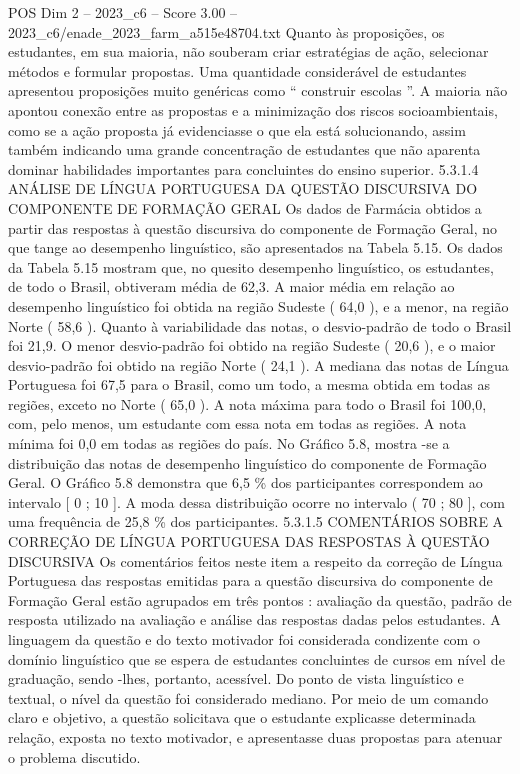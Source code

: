 \begin{textsample}{POS Dim 2 – 2023\_c6 – Score 3.00 – 2023\_c6/enade\_2023\_farm\_a515e48704.txt}
Quanto às proposições, os estudantes, em sua maioria, não souberam criar estratégias de ação, selecionar métodos e formular propostas.
Uma quantidade considerável de estudantes apresentou proposições muito genéricas como “ construir escolas ”.
A maioria não apontou conexão entre as propostas e a minimização dos riscos socioambientais, como se a ação proposta já evidenciasse o que ela está solucionando, assim também indicando uma grande concentração de estudantes que não aparenta dominar habilidades importantes para concluintes do ensino superior. 5.3.1.4 ANÁLISE DE LÍNGUA PORTUGUESA DA QUESTÃO DISCURSIVA DO COMPONENTE DE FORMAÇÃO GERAL Os dados de Farmácia obtidos a partir das respostas à questão discursiva do componente de Formação Geral, no que tange ao desempenho linguístico, são apresentados na Tabela 5.15.
Os dados da Tabela 5.15 mostram que, no quesito desempenho linguístico, os estudantes, de todo o Brasil, obtiveram média de 62,3.
A maior média em relação ao desempenho linguístico foi obtida na região Sudeste ( 64,0 ), e a menor, na região Norte ( 58,6 ).
Quanto à variabilidade das notas, o desvio-padrão de todo o Brasil foi 21,9.
O menor desvio-padrão foi obtido na região Sudeste ( 20,6 ), e o maior desvio-padrão foi obtido na região Norte ( 24,1 ).
A mediana das notas de Língua Portuguesa foi 67,5 para o Brasil, como um todo, a mesma obtida em todas as regiões, exceto no Norte ( 65,0 ).
A nota máxima para todo o Brasil foi 100,0, com, pelo menos, um estudante com essa nota em todas as regiões.
A nota mínima foi 0,0 em todas as regiões do país.
No Gráfico 5.8, mostra -se a distribuição das notas de desempenho linguístico do componente de Formação Geral.
O Gráfico 5.8 demonstra que 6,5 \% dos participantes correspondem ao intervalo [ 0 ; 10 ].
A moda dessa distribuição ocorre no intervalo ( 70 ; 80 ], com uma frequência de 25,8 \% dos participantes. 5.3.1.5 COMENTÁRIOS SOBRE A CORREÇÃO DE LÍNGUA PORTUGUESA DAS RESPOSTAS À QUESTÃO DISCURSIVA Os comentários feitos neste item a respeito da correção de Língua Portuguesa das respostas emitidas para a questão discursiva do componente de Formação Geral estão agrupados em três pontos : avaliação da questão, padrão de resposta utilizado na avaliação e análise das respostas dadas pelos estudantes.
A linguagem da questão e do texto motivador foi considerada condizente com o domínio linguístico que se espera de estudantes concluintes de cursos em nível de graduação, sendo -lhes, portanto, acessível.
Do ponto de vista linguístico e textual, o nível da questão foi considerado mediano.
Por meio de um comando claro e objetivo, a questão solicitava que o estudante explicasse determinada relação, exposta no texto motivador, e apresentasse duas propostas para atenuar o problema discutido.

\end{textsample}
